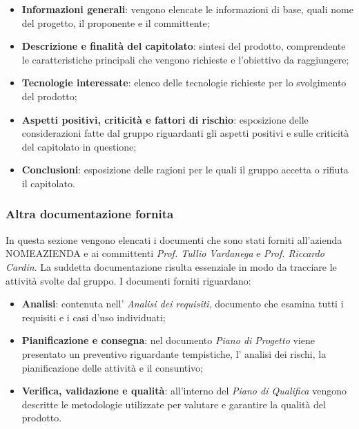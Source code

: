 \begin{itemize}

\item \textbf{Informazioni generali}: vengono elencate le informazioni di base,  quali nome del progetto,  il proponente e il committente;

\item \textbf{Descrizione e finalità del capitolato}: sintesi del prodotto, comprendente le caratteristiche principali che vengono richieste e l'obiettivo da raggiungere;

\item \textbf{Tecnologie interessate}: elenco delle tecnologie richieste per lo svolgimento del prodotto;

\item \textbf{Aspetti positivi,  criticità e fattori di rischio}: esposizione delle considerazioni fatte dal gruppo riguardanti gli aspetti positivi e sulle criticità del capitolato in questione;

\item \textbf{Conclusioni}: esposizione delle ragioni per le quali il gruppo accetta o rifiuta il capitolato.

\end{itemize}

\subsubsection{Altra documentazione fornita}

In questa sezione vengono elencati i documenti che sono stati forniti all'azienda NOMEAZIENDA e ai committenti \textit{Prof. Tullio Vardanega} e \textit{Prof.  Riccardo Cardin}.  La suddetta documentazione risulta essenziale in modo da tracciare le attività  svolte dal gruppo.
I documenti forniti riguardano: 
\begin{itemize}

\item \textbf{Analisi}: contenuta nell' \textit{Analisi dei requisiti},  documento che esamina tutti i requisiti e i casi d'uso individuati;
\item \textbf{Pianificazione e consegna}: nel documento \textit{Piano di Progetto} viene presentato un preventivo riguardante tempistiche,  l' analisi dei rischi, la pianificazione delle attività e il consuntivo;
\item \textbf{Verifica,  validazione e qualità}: all'interno del \textit{Piano di Qualifica} vengono descritte le metodologie utilizzate per valutare e garantire la qualità del prodotto.

\end{itemize}

